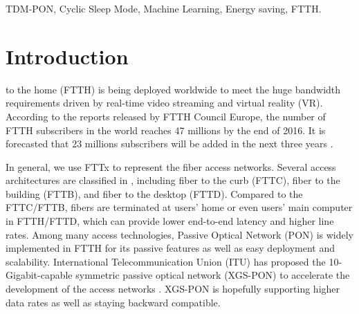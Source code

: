 \documentclass[journal]{IEEEtran}
\begin{document}
\begin{IEEEkeywords}
TDM-PON, Cyclic Sleep Mode, Machine Learning, Energy saving, FTTH.
\end{IEEEkeywords}






%
\IEEEpeerreviewmaketitle



\section{Introduction}
% 
% 
% 
% 
 to the home (FTTH) is being deployed worldwide to meet the huge bandwidth requirements driven by real-time video streaming and virtual reality (VR). According to the reports released by FTTH Council Europe, the number of FTTH subscribers in the world reaches 47 millions by the end of 2016. It is forecasted that 23 millions subscribers will be added in the next three years \cite{ftth}.

In general, we use FTTx to represent the fiber access networks. Several access architectures are classified in \cite{IEEFTTx}, including fiber to the curb (FTTC), fiber to the building (FTTB), and fiber to the desktop (FTTD). Compared to the FTTC/FTTB, fibers are terminated at users' home or even users' main computer in FTTH/FTTD, which can provide lower end-to-end latency and higher line rates. Among many access technologies, Passive Optical Network (PON) is widely implemented in FTTH for its passive features as well as easy deployment and scalability. International Telecommunication Union (ITU) has proposed the 10-Gigabit-capable symmetric passive optical network (XGS-PON) to accelerate the development of the access networks \cite{IEEERecommend}. XGS-PON is hopefully supporting higher data rates as well as staying backward compatible.
\end{document}
